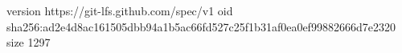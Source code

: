 version https://git-lfs.github.com/spec/v1
oid sha256:ad2e4d8ac161505dbb94a1b5ac66fd527c25f1b31af0ea0ef99882666d7e2320
size 1297
